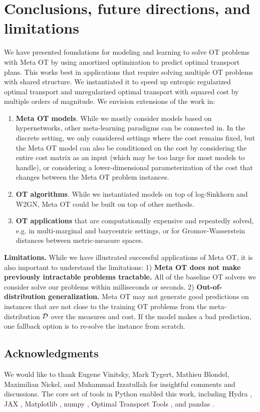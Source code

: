 \documentclass{article}
\newcommand{\eg}{e.g.\xspace}
\begin{document}
\section{Conclusions, future directions, and limitations}
\label{sec:con}
We have presented foundations for modeling and learning to
solve OT problems with Meta OT by using amortized optimization
to predict optimal transport plans.
This works best in applications that require solving
multiple OT problems with shared structure.
We instantiated it to speed up entropic regularized optimal
transport and unregularized optimal transport with squared
cost by multiple orders of magnitude.
We envision extensions of the work in:
\begin{enumerate}
\item \textbf{Meta OT models}.
While we mostly consider models based on hypernetworks,
other meta-learning paradigms can be connected in.
In the discrete setting, we only considered settings where
the cost remains fixed, but the Meta OT model can also be conditioned
on the cost by considering the entire cost matrix as an input
(which may be too large for most models to handle), or considering
a lower-dimensional parameterization of the cost that changes between
the Meta OT problem instances.
\item \textbf{OT algorithms}. While we instantiated
models on top of log-Sinkhorn and W2GN, Meta OT
could be built on top of other methods.
\item \textbf{OT applications} that are computationally
expensive and repeatedly solved, \eg in multi-marginal
and barycentric settings, or for Gromov-Wasserstein
distances between metric-measure spaces.
\end{enumerate}

\textbf{Limitations.}
While we have illustrated successful applications of Meta OT,
it is also important to understand the limitations:
1) \textbf{Meta OT does not make previously intractable
problems tractable.}
All of the baseline OT solvers we consider solve
our problems within milliseconds or seconds.
2) \textbf{Out-of-distribution generalization.}
Meta OT may not generate good predictions on instances
that are not close to the training OT problems from the
meta-distribution ${\mathcal{D}}$ over the measures and cost.
If the model makes a bad prediction,
one fallback option is to re-solve the instance from scratch.


\subsection*{Acknowledgments}
We would like to thank
Eugene Vinitsky,
Mark Tygert,
Mathieu Blondel,
Maximilian Nickel, and
Muhammad Izzatullah
for insightful comments and discussions.
The core set of tools in Python
\citep{van1995python,oliphant2007python}
enabled this work, including
Hydra \citep{Yadan2019Hydra},
JAX \citep{jax2018github},
Matplotlib \citep{hunter2007matplotlib},
numpy \citep{oliphant2006guide,van2011numpy},
Optimal Transport Tools \citep{cuturi2022optimal},
and pandas \citep{mckinney2012python}.
\end{document}
